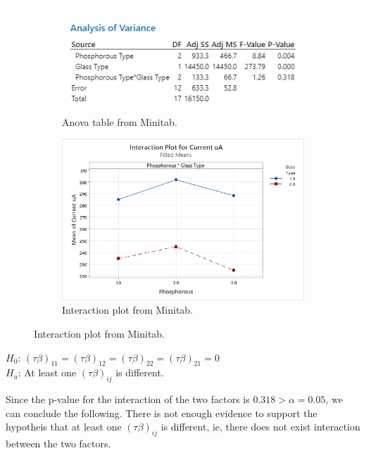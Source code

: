 \documentclass{article}
\begin{document}
\begin{figure}[h]
    \centering
    \begin{subfigure}[b]{0.4\textwidth}
        \includegraphics[width=1\textwidth]{./images/3_b.png}
        \caption{Anova table from Minitab.}
      \label{fig:img1}
    \end{subfigure}
    \hfill
    \begin{subfigure}[b]{0.5\textwidth}
        \includegraphics[width=1\textwidth]{./images/3_b_2.png}
        \caption{Interaction plot from Minitab.}
      \label{fig:img2}
    \end{subfigure}
    \label{fig:both}
\end{figure}

\begin{flushleft}
    $H_0$: $(\tau \beta)_{11} = (\tau \beta)_{12} = (\tau \beta)_{22} = (\tau \beta)_{21} = 0$ \\
    $H_a$: At least one $(\tau \beta)_{ij}$ is different.\\
\end{flushleft}

Since the p-value for the interaction of the two factors is $0.318 > \alpha = 0.05$, we can conclude the following.
There is not enough evidence to support the hypotheis that at least one $(\tau \beta)_{ij}$ is different,
ie, there does not exist interaction between the two factors. 
\end{document}
